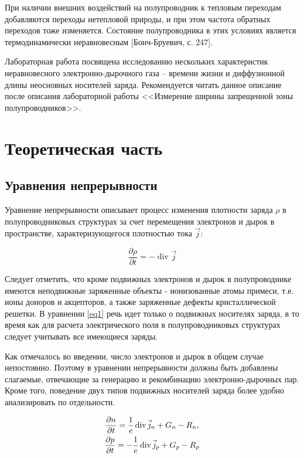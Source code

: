 При наличии внешних воздействий на полупроводник к тепловым переходам добавляются переходы нетепловой природы, и при этом частота обратных переходов тоже изменяется. Состояние полупроводника в этих условиях является термодинамически неравновесным [Бонч-Бруевич, с. 247].

Лабораторная работа посвящена исследованию нескольких характеристик неравновесного электронно-дырочного газа -- времени жизни и диффузионной длины неосновных носителей заряда. Рекомендуется читать данное описание после описания лабораторной работы <<Измерение ширины запрещенной зоны полупроводников>>.

\section{Теоретическая часть}
\subsection{Уравнения непрерывности}

Уравнение непрерывности описывает процесс изменения плотности заряда $\rho$ в полупроводниковых структурах за счет перемещения электронов и дырок в пространстве, характеризующегося плотностью тока $\vec{j}$:

\begin{equation}
	\label{eq1}
	\frac{\partial \rho}{\partial t}=-\operatorname{div} \vec{j}
\end{equation}

Следует отметить, что кроме подвижных электронов и дырок в полупроводнике имеются неподвижные заряженные объекты - ионизованные атомы примеси, т.е. ионы доноров и акцепторов, а также заряженные дефекты кристаллической решетки. В уравнении \eqref{eq1} речь идет только о подвижных носителях заряда, в то время как для расчета электрического поля в полупроводниковых структурах следует учитывать все имеющиеся заряды.

Как отмечалось во введении, число электронов и дырок в общем случае непостоянно. Поэтому в уравнении непрерывности должны быть добавлены слагаемые, отвечающие за генерацию и рекомбинацию электронно-дырочных пар. Кроме того, поведение двух типов подвижных носителей заряда более удобно анализировать по отдельности.

\begin{gather}
	\label{eq2}
	\frac{\partial n}{\partial t}=\frac{1}{e} \operatorname{div} \vec{j}_{n}+G_{n}-R_{n},\\ \nonumber
	\frac{\partial p}{\partial t}=-\frac{1}{e} \operatorname{div} \vec{j}_{p}+G_{p}-R_{p}
\end{gather}

